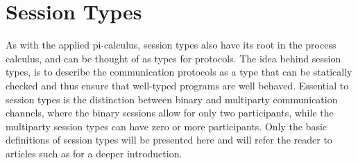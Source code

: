 \section{Session Types}
As with the applied pi-calculus, session types also have its root in the process calculus, and can be thought of as types for protocols. The idea behind session types, is to describe the communication protocols as a type that can be statically checked and thus ensure that well-typed programs are well behaved. Essential to session types is the distinction between binary and multiparty communication channels, where the binary sessions allow for only two participants, while the multiparty session types can have zero or more participants. Only the basic definitions of session types will be presented here and will refer the reader to articles such as \citeauthor{DBLP:journals/csur/HuttelLVCCDMPRT16} for a deeper introduction. 

